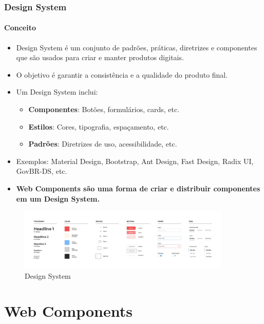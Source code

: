 \documentclass[
	9pt, %
	t, %
]{beamer}
\newcommand{\yellowbox}[1]{\colorbox{yellow!75}{#1}}
\begin{document}
\begin{frame}
	\frametitle{Design System}
	\framesubtitle{Conceito}

	\begin{itemize}
		\item Design System é um conjunto de \yellowbox{padrões, práticas, diretrizes e
			      componentes} que são usados para criar e manter produtos digitais.
		\item O objetivo é garantir a consistência e a qualidade do produto final.
		\item Um Design System inclui:
		      \begin{itemize}
			      \item \textbf{Componentes}: Botões, formulários, cards, etc.
			      \item \textbf{Estilos}: Cores, tipografia, espaçamento, etc.
			      \item \textbf{Padrões}: Diretrizes de uso, acessibilidade, etc.
		      \end{itemize}
		\item Exemplos: Material Design, Bootstrap, Ant Design, Fast Design, Radix UI,
		      GovBR-DS, etc.
		\item \textbf{Web Components são uma forma de criar e distribuir componentes em um Design System.}
	\end{itemize}

	\begin{figure}
		\centering
		\includegraphics[width=0.9\textwidth]{design_system.jpg}
		\caption{Design System}
	\end{figure}

\end{frame}

\section{Web Components}
\end{document}

